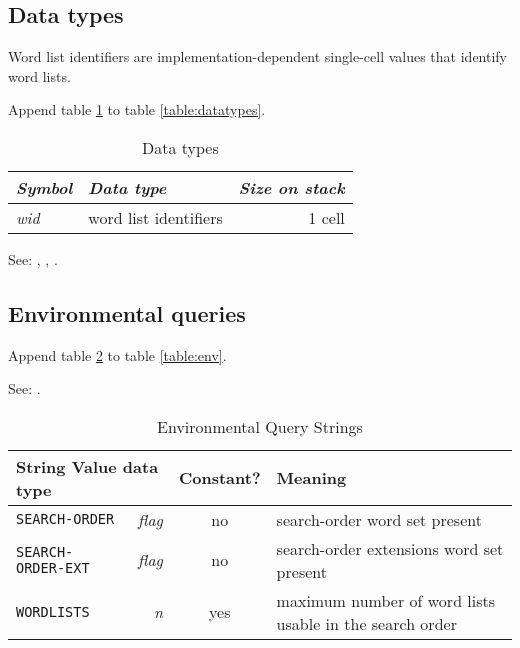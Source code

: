 \subsection{Data types} %

Word list identifiers are implementation-dependent single-cell
values that identify word lists.

Append table \ref{search:types} to table \ref{table:datatypes}.

\begin{table}[h]
  \begin{center}
	\caption{Data types}
	\label{search:types}
	\begin{tabular}{llr}
	\hline\hline
	\emph{Symbol} & \emph{Data type} & \emph{Size on stack} \\
	\hline
	\emph{wid}		& word list identifiers	& 1 cell \\
	\hline\hline
	\end{tabular}
  \end{center}
\end{table}

See: ,
,
.

\subsection{Environmental queries} %

Append table \ref{search:env} to table \ref{table:env}.

See: .

\begin{table}[ht]
  \begin{center}
	\caption{Environmental Query Strings}
	\label{search:env}
	\begin{tabular}{p{9em}rcp{}}
		\hline\hline
		\multicolumn{2}{l}{String \hfill Value data type} & Constant? & Meaning \\
		\hline
		\texttt{SEARCH-ORDER}		& \emph{flag}	& no	&
			search-order word set present \\
		\texttt{SEARCH-ORDER-EXT}	& \emph{flag}	& no	&
			search-order extensions word set present \\
		\texttt{WORDLISTS}			& \emph{n}		& yes	&
			maximum number of word lists usable in the search order\\
		\hline\hline
	\end{tabular}
  \end{center}
\end{table}

